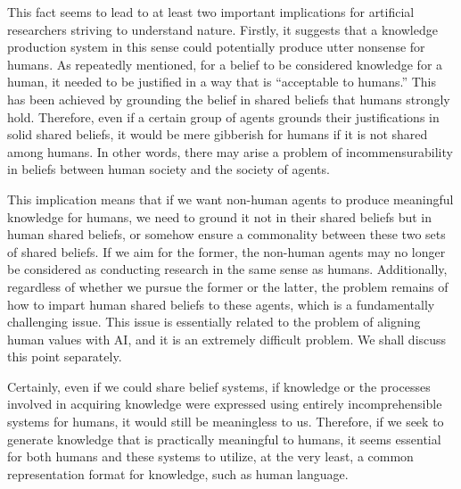 \documentclass{book}
\begin{document}
This fact seems to lead to at least two important implications for artificial researchers striving to understand nature. Firstly, it suggests that a knowledge production system in this sense could potentially produce utter nonsense for humans. As repeatedly mentioned, for a belief to be considered knowledge for a human, it needed to be justified in a way that is ``acceptable to humans.'' This has been achieved by grounding the belief in shared beliefs that humans strongly hold. Therefore, even if a certain group of agents grounds their justifications in solid shared beliefs, it would be mere gibberish for humans if it is not shared among humans. In other words, there may arise a problem of incommensurability \cite{kuhn1962} in beliefs between human society and the society of agents. 

This implication means that if we want non-human agents to produce meaningful knowledge for humans, we need to ground it not in their shared beliefs but in human shared beliefs, or somehow ensure a commonality between these two sets of shared beliefs. If we aim for the former, the non-human agents may no longer be considered as conducting research in the same sense as humans. Additionally, regardless of whether we pursue the former or the latter, the problem remains of how to impart human shared beliefs to these agents, which is a fundamentally challenging issue. This issue is essentially related to the problem of aligning human values with AI, and it is an extremely difficult problem. We shall discuss this point separately.

Certainly, even if we could share belief systems, if knowledge or the processes involved in acquiring knowledge were expressed using entirely incomprehensible systems for humans, it would still be meaningless to us. Therefore, if we seek to generate knowledge that is practically meaningful to humans, it seems essential for both humans and these systems to utilize, at the very least, a common representation format for knowledge, such as human language.
\end{document}
